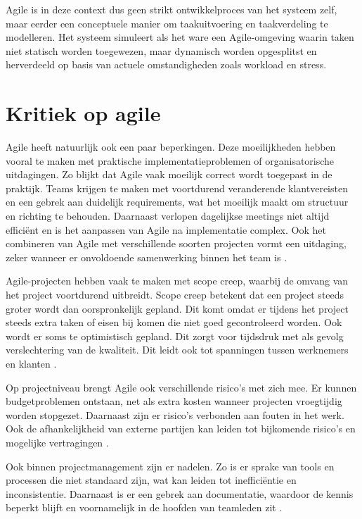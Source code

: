 Agile is in deze context dus geen strikt ontwikkelproces van het systeem zelf, maar eerder een conceptuele manier om taakuitvoering en taakverdeling te modelleren. Het systeem simuleert als het ware een Agile-omgeving waarin taken niet statisch worden toegewezen, maar dynamisch worden opgesplitst en herverdeeld op basis van actuele omstandigheden zoals workload en stress.

\section{Kritiek op agile}
\label{ch:kritiek-op-agile} 
\vspace{1em}Agile heeft natuurlijk ook een paar beperkingen. Deze moeilijkheden hebben vooral te maken met praktische implementatieproblemen of organisatorische uitdagingen. Zo blijkt dat Agile vaak moeilijk correct wordt toegepast in de praktijk. Teams krijgen te maken met voortdurend veranderende klantvereisten en een gebrek aan duidelijk requirements, wat het moeilijk maakt om structuur en richting te behouden. Daarnaast verlopen dagelijkse meetings niet altijd efficiënt en is het aanpassen van Agile na implementatie complex. Ook het combineren van Agile met verschillende soorten projecten vormt een uitdaging, zeker wanneer er onvoldoende samenwerking binnen het team is \autocite{Ijaz_2022}. 
 
Agile-projecten hebben vaak te maken met scope creep, waarbij de omvang van het project voortdurend uitbreidt. Scope creep betekent dat een project steeds groter wordt dan oorspronkelijk gepland. Dit komt omdat er tijdens het project steeds extra taken of eisen bij komen die niet goed gecontroleerd worden. Ook wordt er soms te optimistisch gepland. Dit zorgt voor tijdsdruk met als gevolg verslechtering van de kwaliteit. Dit leidt ook tot spanningen tussen werknemers en klanten \autocite{Ijaz_2022}.

Op projectniveau brengt Agile ook verschillende risico’s met zich mee. Er kunnen budgetproblemen ontstaan, net als extra kosten wanneer projecten vroegtijdig worden stopgezet. Daarnaast zijn er risico’s verbonden aan fouten in het werk. Ook de afhankelijkheid van externe partijen kan leiden tot bijkomende risico’s en mogelijke vertragingen \autocite{Ijaz_2022}.

Ook binnen projectmanagement zijn er nadelen. Zo is er sprake van tools en processen die niet standaard zijn, wat kan leiden tot inefficiëntie en inconsistentie. Daarnaast is er een gebrek aan documentatie, waardoor de kennis beperkt blijft en voornamelijk in de hoofden van teamleden zit \autocite{Ijaz_2022}.

